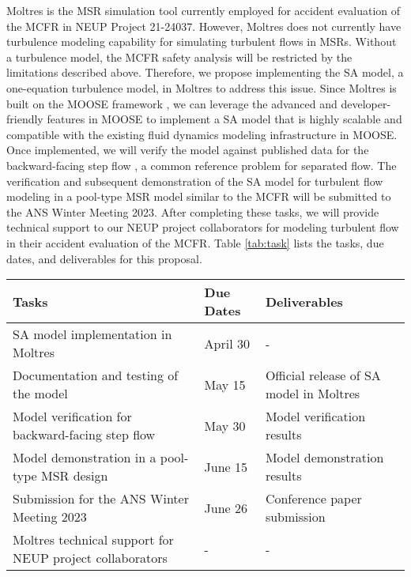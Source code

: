 \documentclass[letterpaper,11pt]{article}
\begin{document}
Moltres is the \gls{MSR} simulation tool currently employed for accident evaluation of the
\gls{MCFR} in NEUP Project 21-24037. However, Moltres does not currently have turbulence modeling
capability for simulating turbulent flows in \glspl{MSR}. Without a turbulence model, the
\gls{MCFR} safety analysis will be restricted by the limitations described above. Therefore, we
propose implementing the \gls{SA} model, a one-equation turbulence model,
in Moltres to address this issue. Since Moltres is built on the \gls{MOOSE} framework
\cite{lindsay_20_2022}, we can
leverage the advanced and developer-friendly features in \gls{MOOSE} to implement a \gls{SA} model
that is highly scalable and compatible with the existing fluid dynamics modeling infrastructure in
\gls{MOOSE}. Once implemented, we will verify the model against published data for the
backward-facing step flow \cite{chen_review_2018}, a common reference problem for separated flow.
The verification and subsequent demonstration of the \gls{SA} model for turbulent flow modeling in
a pool-type \gls{MSR} model similar to the \gls{MCFR} will be submitted to the ANS Winter Meeting
2023. After completing these tasks, we will provide technical support to our NEUP project
collaborators for modeling turbulent flow in their accident evaluation of the \gls{MCFR}. Table
\ref{tab:task} lists the tasks, due dates, and deliverables for this proposal.

\begin{table*}[h]
  \centering
  \footnotesize
  \caption{Tasks, due dates, and deliverables relating to the implementation of the \gls{SA} model
  in Moltres and its subsequent use for coupled neutronics/thermal-hydraulics modeling of the
  \gls{MCFR}. All dates are in the year 2023.}
  \begin{tabular}{l l l}
    \toprule
    \textbf{Tasks} & \textbf{Due Dates} & \textbf{Deliverables}\\
    \midrule
    \gls{SA} model implementation in Moltres & April 30 & - \\
    Documentation and testing of the model & May 15 & Official release of \gls{SA} model
    in Moltres \\
    Model verification for backward-facing step flow & May 30 & Model verification results \\
    Model demonstration in a pool-type \gls{MSR} design & June 15 & Model demonstration results \\
    Submission for the ANS Winter Meeting 2023 & June 26 & Conference paper submission\\
    Moltres technical support for NEUP project collaborators & - & - \\
    \bottomrule
  \end{tabular}
  \label{tab:task}
\end{table*}

{
\footnotesize


}
\end{document}
